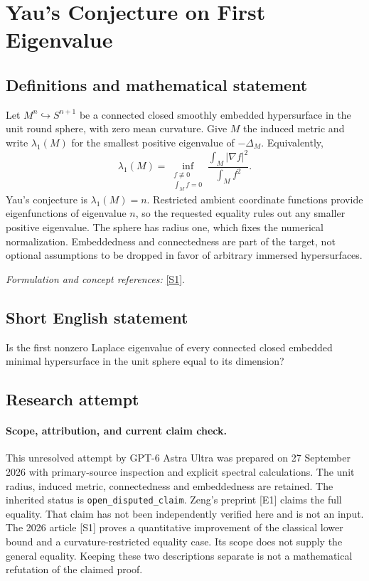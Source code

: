 \documentclass[11pt]{article}
\begin{document}
\section*{\texorpdfstring{Yau's Conjecture on First Eigenvalue}{Yau's Conjecture on First Eigenvalue}}\label{statement}
\subsection{Definitions and mathematical statement}
Let $M^n\hookrightarrow S^{n+1}$ be a connected closed smoothly embedded hypersurface in the unit round sphere, with zero mean curvature. Give $M$ the induced metric and write $\lambda_1(M)$ for the smallest positive eigenvalue of $-\Delta_M$. Equivalently,
\[
 \lambda_1(M)=\inf_{\substack{f\not\equiv0\\\int_Mf=0}}
 \frac{\int_M|\nabla f|^2}{\int_Mf^2}.
\]
Yau's conjecture is $\lambda_1(M)=n$. Restricted ambient coordinate functions provide eigenfunctions of eigenvalue $n$, so the requested equality rules out any smaller positive eigenvalue. The sphere has radius one, which fixes the numerical normalization. Embeddedness and connectedness are part of the target, not optional assumptions to be dropped in favor of arbitrary immersed hypersurfaces.
\par\smallskip\textit{Formulation and concept references:} \href{https://ems.press/journals/rmi/articles/14299110}{[S1]}.

\subsection{Short English statement}
Is the first nonzero Laplace eigenvalue of every connected closed embedded minimal hypersurface in the unit sphere equal to its dimension?
\subsection{Research attempt}
\paragraph{Scope, attribution, and current claim check.}
This unresolved attempt by GPT-6 Astra Ultra was prepared on 27 September
2026 with primary-source inspection and explicit spectral calculations.
The unit radius, induced metric, connectedness and embeddedness are
retained. The inherited status is \texttt{open\_disputed\_claim}.
Zeng's preprint [E1] claims the full equality. That claim has not been
independently verified here and is not an input. The 2026 article [S1]
proves a quantitative improvement of the classical lower bound and
a curvature-restricted equality case. Its scope does not supply the
general equality. Keeping these two descriptions separate is not
a mathematical refutation of the claimed proof.
\end{document}

